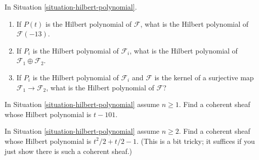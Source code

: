 \begin{exercise}
\label{exercise-hilbert-pol-easy}
In Situation \ref{situation-hilbert-polynomial}.
\begin{enumerate}
\item If $P(t)$ is the Hilbert polynomial of $\mathcal{F}$,
what is the Hilbert polynomial of $\mathcal{F}(-13)$.
\item If $P_i$ is the Hilbert polynomial of $\mathcal{F}_i$,
what is the Hilbert polynomial of $\mathcal{F}_1 \oplus \mathcal{F}_2$.
\item If $P_i$ is the Hilbert polynomial of $\mathcal{F}_i$ and
$\mathcal{F}$ is the kernel of a surjective map
$\mathcal{F}_1 \to \mathcal{F}_2$, what is the Hilbert polynomial of
$\mathcal{F}$?
\end{enumerate}
\end{exercise}

\begin{exercise}
\label{exercise-find-given-hilbert-pol-dim-1}
In Situation \ref{situation-hilbert-polynomial} assume $n \geq 1$.
Find a coherent sheaf whose Hilbert polynomial is $t - 101$.
\end{exercise}

\begin{exercise}
\label{exercise-find-given-hilbert-pol-dim-2}
In Situation \ref{situation-hilbert-polynomial} assume $n \geq 2$.
Find a coherent sheaf whose Hilbert polynomial is
$t^2/2 + t/2 - 1$. (This is a bit tricky; it suffices
if you just show there is such a coherent sheaf.)
\end{exercise}

